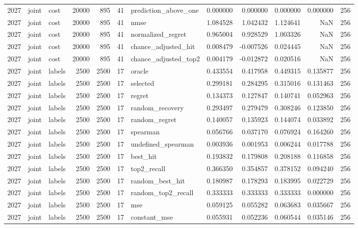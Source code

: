 \begin{tabular}{rllrrrlrrrrr}
2027 & joint & cost & 20000 & 895 & 41 & prediction_above_one & 0.000000 & 0.000000 & 0.000000 & 0.000000 & 256 \\
2027 & joint & cost & 20000 & 895 & 41 & nmse & 1.084528 & 1.042432 & 1.124641 & NaN & 256 \\
2027 & joint & cost & 20000 & 895 & 41 & normalized_regret & 0.965004 & 0.928529 & 1.003326 & NaN & 256 \\
2027 & joint & cost & 20000 & 895 & 41 & chance_adjusted_hit & 0.008479 & -0.007526 & 0.024445 & NaN & 256 \\
2027 & joint & cost & 20000 & 895 & 41 & chance_adjusted_top2 & 0.004179 & -0.012872 & 0.020516 & NaN & 256 \\
2027 & joint & labels & 2500 & 2500 & 17 & oracle & 0.433554 & 0.417958 & 0.449315 & 0.135877 & 256 \\
2027 & joint & labels & 2500 & 2500 & 17 & selected & 0.299181 & 0.284295 & 0.315016 & 0.131463 & 256 \\
2027 & joint & labels & 2500 & 2500 & 17 & regret & 0.134373 & 0.127847 & 0.140741 & 0.052963 & 256 \\
2027 & joint & labels & 2500 & 2500 & 17 & random_recovery & 0.293497 & 0.279479 & 0.308246 & 0.123850 & 256 \\
2027 & joint & labels & 2500 & 2500 & 17 & random_regret & 0.140057 & 0.135923 & 0.144074 & 0.033892 & 256 \\
2027 & joint & labels & 2500 & 2500 & 17 & spearman & 0.056766 & 0.037170 & 0.076924 & 0.164260 & 256 \\
2027 & joint & labels & 2500 & 2500 & 17 & undefined_spearman & 0.003936 & 0.001953 & 0.006244 & 0.017788 & 256 \\
2027 & joint & labels & 2500 & 2500 & 17 & best_hit & 0.193832 & 0.179808 & 0.208188 & 0.116858 & 256 \\
2027 & joint & labels & 2500 & 2500 & 17 & top2_recall & 0.366350 & 0.354857 & 0.378152 & 0.094240 & 256 \\
2027 & joint & labels & 2500 & 2500 & 17 & random_best_hit & 0.180987 & 0.178293 & 0.183995 & 0.022729 & 256 \\
2027 & joint & labels & 2500 & 2500 & 17 & random_top2_recall & 0.333333 & 0.333333 & 0.333333 & 0.000000 & 256 \\
2027 & joint & labels & 2500 & 2500 & 17 & mse & 0.059125 & 0.055282 & 0.063683 & 0.035667 & 256 \\
2027 & joint & labels & 2500 & 2500 & 17 & constant_mse & 0.055931 & 0.052236 & 0.060544 & 0.035146 & 256 \\

\end{tabular}
